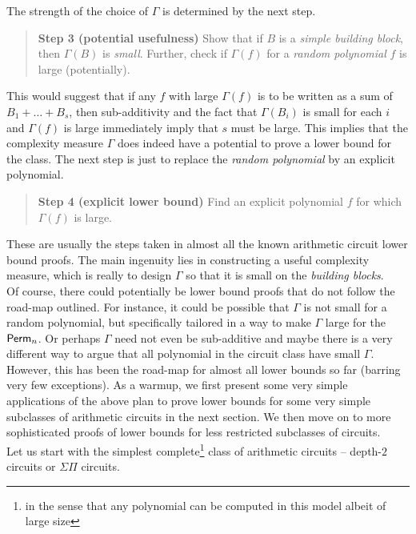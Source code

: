 The strength of the choice of $\Gamma$ is determined by the next step. 

\begin{quote}
{\bf Step 3 (potential usefulness)} Show that if $B$ is a \emph{simple building block}, then $\Gamma(B)$ is \emph{small}.
Further, check if $\Gamma(f)$ for a \emph{random polynomial} $f$ is large (potentially). 
\end{quote}

This would suggest that if any $f$ with large $\Gamma(f)$ is to be written as a sum of $B_1 + \dots + B_s$, then sub-additivity and the fact that $\Gamma(B_i)$ is small for each $i$ and $\Gamma(f)$ is large immediately imply that $s$ must be large. This implies that the complexity measure $\Gamma$ does indeed have a potential to prove a lower bound for the class. The next step is just to replace the \emph{random polynomial} by an explicit polynomial. 

\begin{quote}
{\bf Step 4 (explicit lower bound)} Find an explicit polynomial $f$ for which $\Gamma(f)$ is large. 
\end{quote} 



These are usually the steps taken in almost all the known arithmetic circuit lower bound proofs. The main ingenuity lies in constructing a useful complexity measure, which is really to design $\Gamma$ so that it is small on the \emph{building blocks}. \\

Of course, there could potentially be lower bound proofs that do not follow the road-map outlined. For instance, it could be possible that $\Gamma$ is not small for a random polynomial, but specifically tailored in a way to make $\Gamma$ large for the $\mathsf{Perm}_n$. Or perhaps $\Gamma$ need not even be sub-additive and maybe there is a very different way to argue that all polynomial in the circuit class have small $\Gamma$. However, this has been the road-map for almost all lower bounds so far (barring very few exceptions). As a warmup, we first present some very simple applications of the above plan to prove lower bounds for some very simple subclasses of arithmetic circuits in the next section. We then move on to more sophisticated proofs of lower bounds for less restricted subclasses of circuits. \\


Let us start with the simplest complete\footnote{in the sense that any polynomial can be computed in this model albeit of large size}  class of arithmetic circuits -- depth-$2$ circuits or $\Sigma\Pi$ circuits. 

